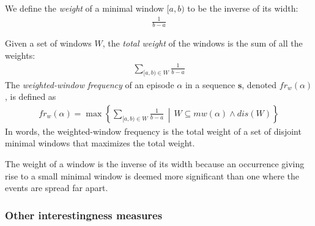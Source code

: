 \begin{definition}
We define the \emph{weight} of a minimal window $ [a, b) $ to be the inverse of its width:
\begin{align*}
\frac1{b - a}
\end{align*}

Given a set of windows $ W $, the \emph{total weight} of the windows is the sum of all the weights:
\begin{align*}
\sum_{[a,b) \in W} \frac1{b - a}
\end{align*}
The \emph{weighted-window frequency} of an episode $ \alpha $ in a sequence $ \boldsymbol{s} $, denoted $ fr_w(\alpha) $, is defined as
\begin{align*}
fr_w(\alpha) = \max \left\{ \sum_{[a, b) \in W}{\frac{1}{b - a}} \,\middle\vert\, W \subseteq mw(\alpha) \wedge dis(W) \right\}
\end{align*}
In words, the weighted-window frequency is the total weight of a set of disjoint minimal windows that maximizes the total weight.
\end{definition}

The weight of a window is the inverse of its width because an occurrence giving rise to a small minimal window is deemed more significant than one where the events are spread far apart.

\subsubsection{Other interestingness measures}
